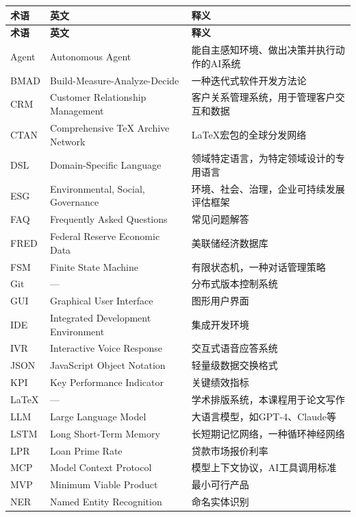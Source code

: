 \begin{table}[H]
\centering
\small
\begin{longtable}{lp{2.5cm}p{7cm}}
\toprule
\textbf{术语} & \textbf{英文} & \textbf{释义} \\
\midrule
\endfirsthead
\toprule
\textbf{术语} & \textbf{英文} & \textbf{释义} \\
\midrule
\endhead
\bottomrule
\endfoot
Agent & Autonomous Agent & 能自主感知环境、做出决策并执行动作的AI系统 \\
BMAD & Build-Measure-Analyze-Decide & 一种迭代式软件开发方法论 \\
CRM & Customer Relationship Management & 客户关系管理系统，用于管理客户交互和数据 \\
CTAN & Comprehensive TeX Archive Network & LaTeX宏包的全球分发网络 \\
DSL & Domain-Specific Language & 领域特定语言，为特定领域设计的专用语言 \\
ESG & Environmental, Social, Governance & 环境、社会、治理，企业可持续发展评估框架 \\
FAQ & Frequently Asked Questions & 常见问题解答 \\
FRED & Federal Reserve Economic Data & 美联储经济数据库 \\
FSM & Finite State Machine & 有限状态机，一种对话管理策略 \\
Git & --- & 分布式版本控制系统 \\
GUI & Graphical User Interface & 图形用户界面 \\
IDE & Integrated Development Environment & 集成开发环境 \\
IVR & Interactive Voice Response & 交互式语音应答系统 \\
JSON & JavaScript Object Notation & 轻量级数据交换格式 \\
KPI & Key Performance Indicator & 关键绩效指标 \\
LaTeX & --- & 学术排版系统，本课程用于论文写作 \\
LLM & Large Language Model & 大语言模型，如GPT-4、Claude等 \\
LSTM & Long Short-Term Memory & 长短期记忆网络，一种循环神经网络 \\
LPR & Loan Prime Rate & 贷款市场报价利率 \\
MCP & Model Context Protocol & 模型上下文协议，AI工具调用标准 \\
MVP & Minimum Viable Product & 最小可行产品 \\
NER & Named Entity Recognition & 命名实体识别 \\

\end{longtable}
\end{table}

